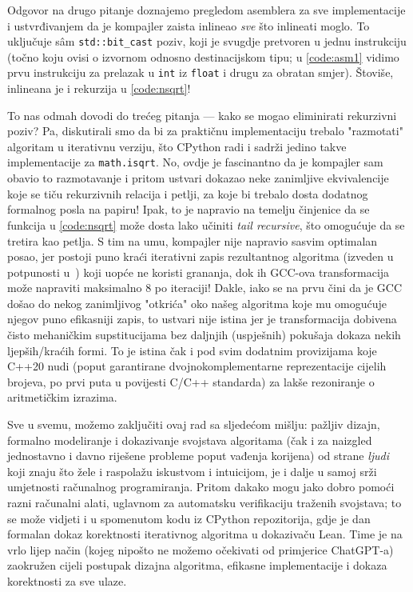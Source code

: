 \documentclass[12pt]{scrartcl}
\begin{document}
Odgovor na drugo pitanje doznajemo pregledom asemblera za sve implementacije i ustvrđivanjem da je kompajler zaista inlineao \emph{sve} što 
inlineati moglo. To uključuje s\^am \verb|std::bit_cast| poziv, koji je svugdje pretvoren u jednu instrukciju (točno koju ovisi o izvornom odnosno
destinacijskom tipu; u \autoref{code:asm1} vidimo prvu instrukciju za prelazak u \verb|int| iz \verb|float| i drugu za obratan smjer). Štoviše,
inlineana je i rekurzija u \autoref{code:nsqrt}!

To nas odmah dovodi do trećeg pitanja --- kako se mogao eliminirati rekurzivni poziv? Pa, diskutirali smo da bi za praktičnu implementaciju trebalo
"razmotati" algoritam u iterativnu verziju, što CPython radi i sadrži jedino takve implementacije za \verb|math.isqrt|. No, ovdje je fascinantno da je
kompajler sam obavio to razmotavanje i pritom ustvari dokazao neke zanimljive ekvivalencije koje se tiču rekurzivnih relacija i petlji, za koje bi
trebalo dosta dodatnog formalnog posla na papiru! Ipak, to je napravio na temelju
činjenice da se funkcija u \autoref{code:nsqrt} može dosta lako učiniti \textsl{tail recursive}, što omogućuje da se tretira kao petlja.
S tim na umu, kompajler nije napravio sasvim optimalan posao, jer postoji puno kraći iterativni zapis rezultantnog algoritma
(izveden u potpunosti u~\cite{mdickpaper}) koji uopće ne koristi grananja,
dok ih GCC-ova transformacija može napraviti maksimalno $8$ po iteraciji! Dakle, iako se na prvu čini da je GCC došao
do nekog zanimljivog "otkrića" oko našeg
algoritma koje mu omogućuje njegov puno efikasniji zapis, to ustvari nije istina jer je transformacija dobivena čisto mehaničkim supstitucijama bez daljnjih
(uspješnih) pokušaja dokaza nekih ljepših/kraćih formi. To je istina čak i pod svim dodatnim provizijama koje C++20 nudi (poput garantirane dvojnokomplementarne
reprezentacije cijelih brojeva, po prvi puta u povijesti C/C++ standarda) za lakše rezoniranje o aritmetičkim izrazima.

Sve u svemu, možemo zaključiti ovaj rad sa sljedećom mišlju: pažljiv dizajn, formalno modeliranje i dokazivanje svojstava algoritama
(čak i za naizgled jednostavno i davno riješene probleme poput vađenja korijena)
od strane \emph{ljudi} koji znaju što žele i raspolažu iskustvom i intuicijom, je i dalje u samoj srži umjetnosti računalnog programiranja. Pritom
dakako mogu jako dobro pomoći razni računalni alati, uglavnom za automatsku verifikaciju traženih svojstava; to se
može vidjeti i u spomenutom kodu iz CPython repozitorija, gdje je dan formalan dokaz korektnosti iterativnog algoritma u dokazivaču Lean.
Time je na vrlo lijep način (kojeg nipošto ne možemo očekivati od primjerice ChatGPT-a)
zaokružen cijeli postupak dizajna algoritma, efikasne implementacije i dokaza korektnosti za sve ulaze.
\pagebreak


\printbibliography
\end{document}
